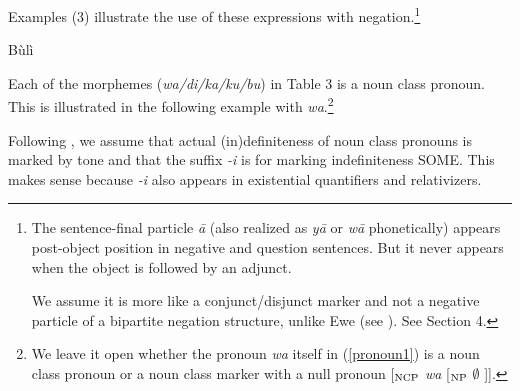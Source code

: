 \documentclass[output=paper,colorlinks,citecolor=brown]{langscibook}
\begin{document}
Examples (3) illustrate the use of these expressions with negation.\footnote{The sentence-final particle \textit{ā} (also realized as \textit{yā} or \textit{wā} phonetically) appears post-object position in negative and question sentences. But it never appears when the object is followed by an adjunct.
\z

We assume it is more like a conjunct/disjunct marker and not a negative particle of a bipartite negation structure, unlike Ewe (see \citealt{CollinsEtAl2017}). See Section 4.  }


\ea Bùlì
\z
\z


Each of the morphemes (\textit{wa/di/ka/ku/bu}) in Table 3 is a noun class pronoun. This is illustrated in the following example with \textit{wa}.\footnote{We leave it open whether the pronoun \textit{wa} itself in (\ref{pronoun1}) is a noun class pronoun or a noun class marker with a null pronoun [$_{\textup{NCP}}$ \textit{wa} [$_{\textup{NP}}$ $\emptyset$ ]].}

{}
\z

Following \cite{HiraiwaEtAl2017}, we assume that actual (in)definiteness of noun class pronouns is marked by tone and that the suffix \textit{-i} is for marking indefiniteness SOME. This makes sense because \textit{-i} also appears in existential quantifiers and relativizers.

\z
\end{document}
